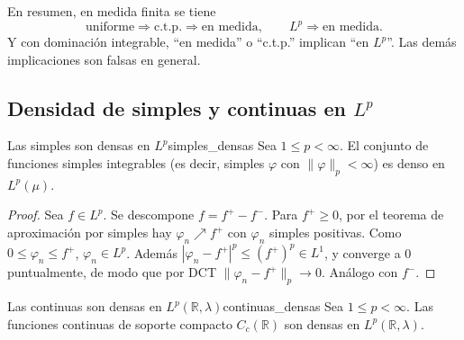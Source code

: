\documentclass[11pt, a4paper]{article}
\begin{document}
\obs En resumen, en medida finita se tiene
$$ \text{uniforme} \Longrightarrow \text{c.t.p.} \Longrightarrow \text{en medida}, \qquad
L^p \Longrightarrow \text{en medida}. $$
Y con dominación integrable, ``en medida'' o ``c.t.p.'' implican ``en $L^p$''. Las demás
implicaciones son falsas en general.

\subsection{Densidad de simples y continuas en \texorpdfstring{$L^p$}{Lp}}

\begin{teorema}{Las simples son densas en $L^p$}{simples_densas}
Sea $1 \le p < \infty$. El conjunto de funciones simples integrables (es decir, simples $\varphi$
con $\|\varphi\|_p < \infty$) es denso en $L^p(\mu)$.
\end{teorema}

\begin{proof}
Sea $f \in L^p$. Se descompone $f = f^+ - f^-$. Para $f^+ \ge 0$, por el teorema de aproximación
por simples hay $\varphi_n \nearrow f^+$ con $\varphi_n$ simples positivas. Como
$0 \le \varphi_n \le f^+$, $\varphi_n \in L^p$. Además $|\varphi_n - f^+|^p \le (f^+)^p \in L^1$,
y converge a 0 puntualmente, de modo que por DCT $\|\varphi_n - f^+\|_p \to 0$. Análogo con $f^-$.
\end{proof}

\begin{teorema}{Las continuas son densas en $L^p(\mathbb{R}, \lambda)$}{continuas_densas}
Sea $1 \le p < \infty$. Las funciones continuas de soporte compacto $C_c(\mathbb{R})$ son densas
en $L^p(\mathbb{R}, \lambda)$.
\end{teorema}
\end{document}
